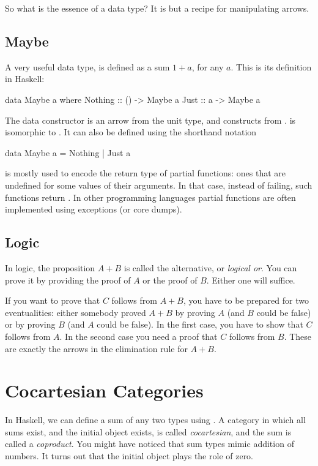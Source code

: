 \documentclass[DaoFP]{subfiles}
\begin{document}
So what is the essence of a data type? It is but a recipe for manipulating arrows.

\subsection{Maybe}

A very useful data type,  is defined as a sum $1 + a$, for any $a$. This is its definition in Haskell:
\begin{haskell}
data Maybe a where
  Nothing :: () -> Maybe a
  Just    ::  a -> Maybe a
\end{haskell}
The data constructor  is an arrow from the unit type, and  constructs  from .  is isomorphic to . It can also be defined using the shorthand notation
\begin{haskell}
data Maybe a = Nothing | Just a
\end{haskell}

 is mostly used to encode the return type of partial functions: ones that are undefined for some values of their arguments. In that case, instead of failing, such functions return . In other programming languages partial functions are often implemented using exceptions (or core dumps).

\subsection{Logic}

In logic, the proposition $A + B$ is called the alternative, or \emph{logical or}. You can prove it by providing the proof of $A$ or the proof of $B$. Either one will suffice. 

If you want to prove that $C$ follows from $A+B$, you have to be prepared for two eventualities: either somebody proved $A+B$ by proving $A$ (and $B$ could be false) or by proving $B$ (and $A$ could be false). In the first case, you have to show that $C$ follows from $A$. In the second case you need a proof that $C$ follows from $B$. These are exactly the arrows in the elimination rule for $A+B$.

\section{Cocartesian Categories}

In Haskell, we can define a sum of any two types using . A category in which all sums exist, and the initial object exists, is called \emph{cocartesian}, and the sum is called a \emph{coproduct}. You might have noticed that sum types mimic addition of numbers. It turns out that the initial object plays the role of zero. 
\end{document}
